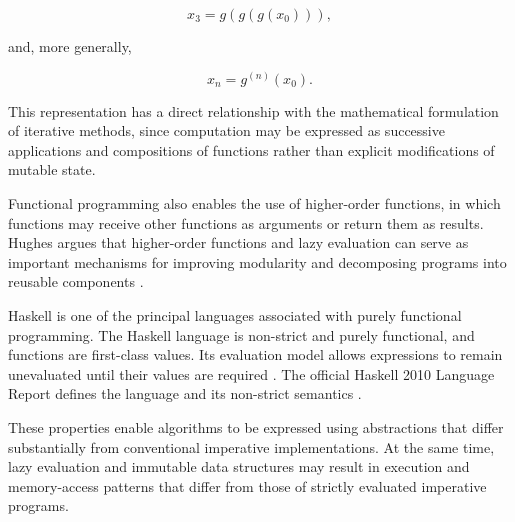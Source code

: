 \begin{equation}
    x_3 = g(g(g(x_0))),
\end{equation}

and, more generally,

\begin{equation}
    x_n = g^{(n)}(x_0).
\end{equation}

This representation has a direct relationship with the mathematical
formulation of iterative methods, since computation may be expressed as
successive applications and compositions of functions rather than explicit
modifications of mutable state.

Functional programming also enables the use of higher-order functions, in
which functions may receive other functions as arguments or return them as
results. Hughes argues that higher-order functions and lazy evaluation can
serve as important mechanisms for improving modularity and decomposing programs
into reusable components
\cite{hughes1989functional}.

Haskell is one of the principal languages associated with purely functional
programming. The Haskell language is non-strict and purely functional, and
functions are first-class values. Its evaluation model allows expressions to
remain unevaluated until their values are required
\cite{marlow2010haskell,hutton2016programming}. The official Haskell 2010
Language Report defines the language and its non-strict semantics
\cite{marlow2010haskell}.

These properties enable algorithms to be expressed using abstractions that
differ substantially from conventional imperative implementations. At the
same time, lazy evaluation and immutable data structures may result in
execution and memory-access patterns that differ from those of strictly
evaluated imperative programs.